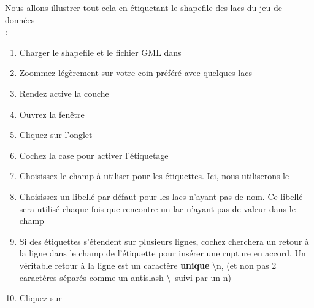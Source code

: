 Nous allons illustrer tout cela en étiquetant le shapefile des lacs du jeu de données\\  :

\begin{enumerate}
\item Charger le shapefile  et le fichier GML  dans \qg
\item Zoommez légèrement sur votre coin préféré avec quelques lacs
\item Rendez active la couche 
\item Ouvrez la fenêtre 
\item Cliquez sur l'onglet 
\item Cochez la case  pour activer l'étiquetage
\item Choisissez le champ à utiliser pour les étiquettes. Ici, nous utiliserons le\\ 
\item Choisissez un libellé par défaut pour les lacs n'ayant pas de nom. Ce libellé sera utilisé chaque fois que \qg rencontre un lac n'ayant pas de valeur dans le champ 
\item Si des étiquettes s'étendent sur plusieurs lignes, cochez  \qg cherchera un retour à la ligne dans le champ de l'étiquette pour insérer une rupture en accord. Un véritable retour à la ligne est un caractère \textbf{unique} \textbackslash n, (et non pas 2 caractères séparés comme un antislash \textbackslash ~suivi par un n)
\item Cliquez sur 
\end{enumerate}


